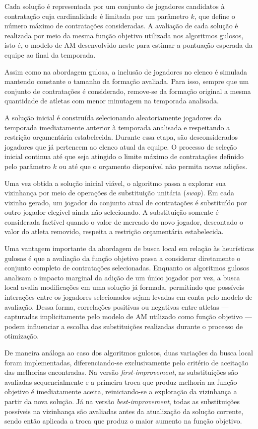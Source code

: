 Cada solução é representada por um conjunto de jogadores candidatos à contratação cuja cardinalidade é limitada por um parâmetro \(k\), que define 
o número máximo de contratações consideradas. A avaliação de cada solução é realizada por meio da mesma função objetivo utilizada nos algoritmos gulosos, 
isto é, o modelo de AM desenvolvido neste para estimar a pontuação esperada da equipe ao final da temporada.

Assim como na abordagem gulosa, a inclusão de jogadores no elenco é simulada mantendo constante o tamanho da formação avaliada. Para isso, 
sempre que um conjunto de contratações é considerado, remove-se da formação original a mesma quantidade de atletas com menor minutagem na temporada analisada.

A solução inicial é construída selecionando aleatoriamente jogadores da temporada imediatamente anterior à temporada analisada e respeitando a restrição 
orçamentária estabelecida. Durante essa etapa, são desconsiderados jogadores que já pertencem ao elenco atual da equipe. O processo de seleção inicial 
continua até que seja atingido o limite máximo de contratações definido pelo parâmetro \(k\) ou até que o orçamento disponível não permita novas adições.

Uma vez obtida a solução inicial viável, o algoritmo passa a explorar sua vizinhança por meio de operações de substituição unitária (\textit{swap}). 
Em cada vizinho gerado, um jogador do conjunto atual de contratações é substituído por outro jogador elegível ainda não selecionado. A substituição 
somente é considerada factível quando o valor de mercado do novo jogador, descontado o valor do atleta removido, respeita a restrição orçamentária estabelecida.

Uma vantagem importante da abordagem de busca local em relação às heurísticas gulosas é que a avaliação da função objetivo passa a considerar diretamente 
o conjunto completo de contratações selecionadas. Enquanto os algoritmos gulosos analisam o impacto marginal da adição de um único jogador por vez, 
a busca local avalia modificações em uma solução já formada, permitindo que possíveis interações entre os jogadores selecionados sejam levadas em 
conta pelo modelo de avaliação. Dessa forma, correlações positivas ou negativas entre atletas — capturadas implicitamente pelo modelo de AM 
utilizado como função objetivo — podem influenciar a escolha das substituições realizadas durante o processo de otimização.

De maneira análoga ao caso dos algoritmos gulosos, duas variações da busca local foram implementadas, diferenciando-se exclusivamente pelo 
critério de aceitação das melhorias encontradas. Na versão \textit{first-improvement}, as substituições são avaliadas sequencialmente e a primeira 
troca que produz melhoria na função objetivo é imediatamente aceita, reiniciando-se a exploração da vizinhança a partir da nova solução. 
Já na versão \textit{best-improvement}, todas as substituições possíveis na vizinhança são avaliadas antes da atualização da solução corrente, 
sendo então aplicada a troca que produz o maior aumento na função objetivo.

